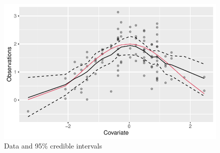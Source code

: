 \documentclass[
  letterpaper,
  DIV=11,
  numbers=noendperiod]{scrartcl}
\begin{document}
\begin{figure}[H]

{\centering \includegraphics{day1_practical_files/figure-pdf/plot_gam-1.pdf}

}

\caption{Data and 95\% credible intervals}

\end{figure}%
\end{document}
